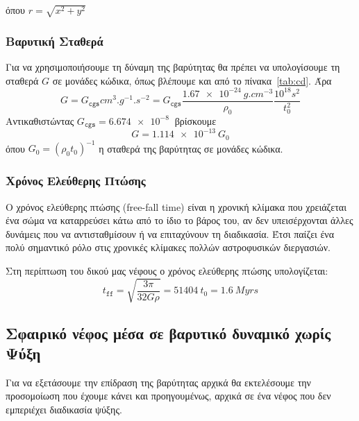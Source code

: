 	όπου $r=\sqrt{x^2+y^2}$
	
	\subsubsection{Βαρυτική Σταθερά}
	Για να χρησιμοποιήσουμε τη δύναμη της βαρύτητας θα πρέπει να υπολογίσουμε τη σταθερά $G$ σε μονάδες κώδικα, όπως βλέπουμε και από το πίνακα~\ref{tab:cd}. Άρα 
	\begin{equation}
		G=G_\texttt{cgs} \si{cm^3.g^{-1}.s^{-2}} = G_\texttt{cgs} \frac{\SI{1.67e-24}{g.cm^{-3}}}{\rho_0}\frac{10^{18}\si{s^2}}{t^2_0}
	\end{equation}
	Αντικαθιστώντας $G_\texttt{cgs}=\SI{6.674e-8}{}$ βρίσκουμε
	\begin{equation}
		\boxed{G=\SI{1.114e-13}{G_0}}
	\end{equation}
	όπου $G_0=(\rho_0 t_0)^{-1}$ η σταθερά της βαρύτητας σε μονάδες κώδικα.
	
	
	\subsubsection{Χρόνος Ελεύθερης Πτώσης}
	Ο χρόνος ελεύθερης πτώσης (free-fall time) είναι η χρονική κλίμακα που χρειάζεται ένα σώμα να καταρρεύσει κάτω από το ίδιο το βάρος του, αν δεν υπεισέρχονται άλλες δυνάμεις που να αντισταθμίσουν ή να επιταχύνουν τη διαδικασία. Έτσι παίζει ένα πολύ σημαντικό ρόλο στις χρονικές κλίμακες πολλών αστροφυσικών διεργασιών.
	
	Στη περίπτωση του δικού μας νέφους ο χρόνος ελεύθερης πτώσης υπολογίζεται:
	\begin{equation}
		t_\texttt{ff}=\sqrt{\frac{3\pi}{32G\rho}} = \SI{51404}{t_0} = \SI{1.6}{Myrs}
	\end{equation}
	
	\subsection{Σφαιρικό νέφος μέσα σε βαρυτικό δυναμικό χωρίς Ψύξη}
	
	Για να εξετάσουμε την επίδραση της βαρύτητας αρχικά θα εκτελέσουμε την προσομοίωση που έχουμε κάνει και προηγουμένως, αρχικά σε ένα νέφος που δεν εμπεριέχει διαδικασία ψύξης.
	
